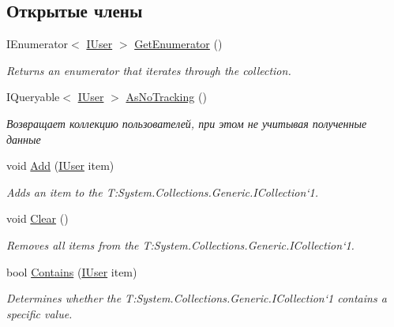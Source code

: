\subsection*{Открытые члены}
\begin{DoxyCompactItemize}
\item 
I\+Enumerator$<$ \hyperlink{interface_security_1_1_interfaces_1_1_model_1_1_i_user}{I\+User} $>$ \hyperlink{class_security_1_1_entity_framework_1_1_collections_1_1_user_collection_af3ed40f7651260c4415ad8dbe541a57e}{Get\+Enumerator} ()
\begin{DoxyCompactList}\small\item\em Returns an enumerator that iterates through the collection. \end{DoxyCompactList}\item 
I\+Queryable$<$ \hyperlink{interface_security_1_1_interfaces_1_1_model_1_1_i_user}{I\+User} $>$ \hyperlink{class_security_1_1_entity_framework_1_1_collections_1_1_user_collection_a1c8263a1db7270fbe6ce624681052d64}{As\+No\+Tracking} ()
\begin{DoxyCompactList}\small\item\em Возвращает коллекцию пользователей, при этом не учитывая полученные данные \end{DoxyCompactList}\item 
void \hyperlink{class_security_1_1_entity_framework_1_1_collections_1_1_user_collection_a0de5ed58d21ed103d1d82bd706ede06f}{Add} (\hyperlink{interface_security_1_1_interfaces_1_1_model_1_1_i_user}{I\+User} item)
\begin{DoxyCompactList}\small\item\em Adds an item to the T\+:\+System.\+Collections.\+Generic.\+I\+Collection`1. \end{DoxyCompactList}\item 
void \hyperlink{class_security_1_1_entity_framework_1_1_collections_1_1_user_collection_a6f99a0cc959603ccb6b43c62b35356e8}{Clear} ()
\begin{DoxyCompactList}\small\item\em Removes all items from the T\+:\+System.\+Collections.\+Generic.\+I\+Collection`1. \end{DoxyCompactList}\item 
bool \hyperlink{class_security_1_1_entity_framework_1_1_collections_1_1_user_collection_a7c69bd803e64d69d528c837e5de7b6af}{Contains} (\hyperlink{interface_security_1_1_interfaces_1_1_model_1_1_i_user}{I\+User} item)
\begin{DoxyCompactList}\small\item\em Determines whether the T\+:\+System.\+Collections.\+Generic.\+I\+Collection`1 contains a specific value. \end{DoxyCompactList}\item 

\end{DoxyCompactItemize}
